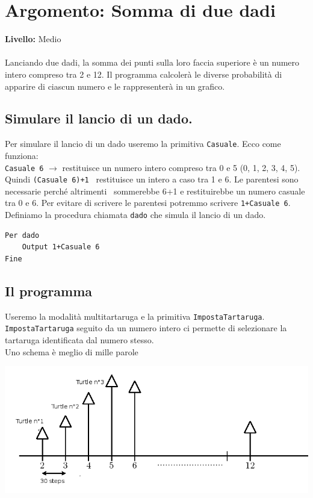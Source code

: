 \chapter{Argomento: Somma di due dadi}
{ }\hfill\textbf{Livello:} Medio\\ \\
Lanciando due dadi, la somma dei punti sulla loro faccia superiore è un numero intero compreso tra 2 e 12. Il programma calcolerà le diverse probabilità di apparire di ciascun numero e le rappresenterà in un grafico.


\section{Simulare il lancio di un dado.}
Per simulare il lancio di un dado useremo la primitiva \texttt{Casuale}. Ecco come funziona: \\

\texttt{Casuale 6} $\longrightarrow$ restituisce un numero intero compreso tra 0 e 5 (0, 1, 2, 3, 4, 5). Quindi \texttt{(Casuale 6)+1 } restituisce un intero a caso tra 1 e 6. Le parentesi sono necessarie perché altrimenti \logo\ sommerebbe 6+1 e restituirebbe un numero casuale tra 0 e 6. Per evitare di scrivere le parentesi potremmo scrivere \texttt{1+Casuale~6}. \\
Definiamo la procedura chiamata \texttt{dado} che simula il lancio di un dado.
\begin{lstlisting}
Per dado
	Output 1+Casuale 6
Fine
\end{lstlisting}


\section{Il programma}
Useremo la modalità multitartaruga e la primitiva \texttt{ImpostaTartaruga}. \texttt{ImpostaTartaruga} seguito da un numero intero ci permette di selezionare la tartaruga identificata dal numero stesso.\\
Uno schema è meglio di mille parole\textellipsis
\begin{center}
	\includegraphics[scale=0.45]{pics/somme-des-schema.png}
\end{center}
\vspace{0.5cm}

